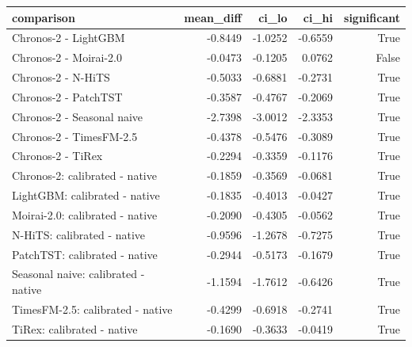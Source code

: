 \begin{tabular}{lrrrr}
\toprule
comparison & mean_diff & ci_lo & ci_hi & significant \\
\midrule
Chronos-2 - LightGBM & -0.8449 & -1.0252 & -0.6559 & True \\
Chronos-2 - Moirai-2.0 & -0.0473 & -0.1205 & 0.0762 & False \\
Chronos-2 - N-HiTS & -0.5033 & -0.6881 & -0.2731 & True \\
Chronos-2 - PatchTST & -0.3587 & -0.4767 & -0.2069 & True \\
Chronos-2 - Seasonal naive & -2.7398 & -3.0012 & -2.3353 & True \\
Chronos-2 - TimesFM-2.5 & -0.4378 & -0.5476 & -0.3089 & True \\
Chronos-2 - TiRex & -0.2294 & -0.3359 & -0.1176 & True \\
Chronos-2: calibrated - native & -0.1859 & -0.3569 & -0.0681 & True \\
LightGBM: calibrated - native & -0.1835 & -0.4013 & -0.0427 & True \\
Moirai-2.0: calibrated - native & -0.2090 & -0.4305 & -0.0562 & True \\
N-HiTS: calibrated - native & -0.9596 & -1.2678 & -0.7275 & True \\
PatchTST: calibrated - native & -0.2944 & -0.5173 & -0.1679 & True \\
Seasonal naive: calibrated - native & -1.1594 & -1.7612 & -0.6426 & True \\
TimesFM-2.5: calibrated - native & -0.4299 & -0.6918 & -0.2741 & True \\
TiRex: calibrated - native & -0.1690 & -0.3633 & -0.0419 & True \\
\bottomrule
\end{tabular}
